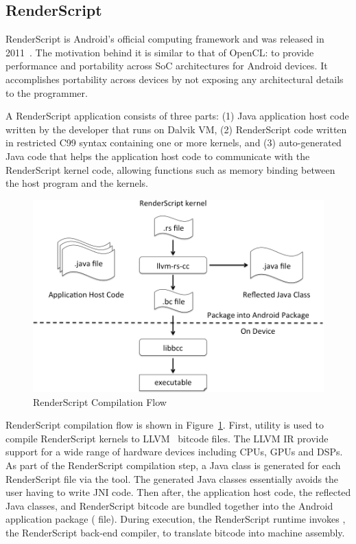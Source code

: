 
\subsection{RenderScript}
RenderScript is Android's official computing framework and was released in 
2011~\cite{RenderScript}. The motivation behind it is similar to that of OpenCL: to provide
performance and portability across SoC architectures for Android devices.
It accomplishes portability across devices by not exposing any architectural details to the programmer.

A RenderScript application consists of three parts: (1) Java application host
code written by the developer that runs on Dalvik VM, (2) RenderScript code
written in restricted C99 syntax containing one or more kernels, and (3)
auto-generated Java code that helps the application host code to communicate with
the RenderScript kernel code, allowing functions such as memory binding between the
host program and the kernels.

\begin{figure}
\centering
\includegraphics[scale=0.28]{figs/renderscript-compile.png}
\caption{RenderScript Compilation Flow}
\label{fig:RSCompilation}
\centering
\end{figure}

RenderScript compilation flow is shown in Figure~\ref{fig:RSCompilation}.
First,  utility is used to compile RenderScript kernels to
LLVM~\cite{LLVM:CGO04} bitcode files. The LLVM IR provide support for a wide range of hardware
devices including CPUs, GPUs and DSPs. 
As part of the RenderScript compilation step, a Java class
is generated for each RenderScript file via the  tool.
The generated Java classes essentially avoids the user having to write JNI code.
Then after, the application host code, the reflected Java classes, and RenderScript bitcode
are bundled together into the Android application package ( file).
During execution, the RenderScript
runtime invokes , the RenderScript back-end compiler, to translate
bitcode into machine assembly.


